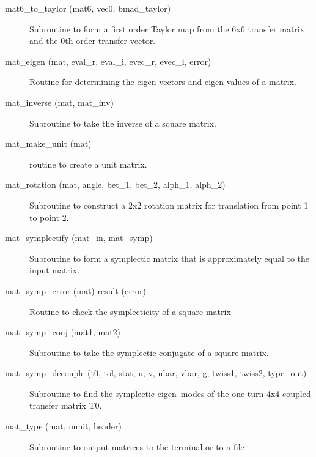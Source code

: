 \begin{description}
\item[mat6_to_taylor (mat6, vec0, bmad_taylor)] \Newline
Subroutine to form a first order Taylor map from the 6x6 transfer matrix 
and the 0th order transfer vector. 

\label{r:mat.eigen}
\item[mat_eigen (mat, eval_r, eval_i, evec_r, evec_i, error)] \Newline 
Routine for determining the eigen vectors and eigen values of a matrix.

\label{r:mat.inverse}
\item[mat_inverse (mat, mat_inv)] \Newline
Subroutine to take the inverse of a square matrix. 

\label{r:mat.make.unit}
\item[mat_make_unit (mat)] \Newline 
     routine to create a unit matrix.

\label{r:mat.rotation}
\item[mat_rotation (mat, angle, bet_1, bet_2, alph_1, alph_2)] \Newline 
     Subroutine to construct a 2x2 rotation matrix for translation from
     point 1 to point 2.

\label{r:mat.symplectify}
\item[mat_symplectify (mat_in, mat_symp)] \Newline
Subroutine to form a symplectic matrix that is approximately equal to the input matrix. 

\label{r:mat.symp.error}
\item[mat_symp_error (mat) result (error)] \Newline
Routine to check the symplecticity of a square matrix 

\label{r:mat.symp.conj}
\item[mat_symp_conj (mat1, mat2)] \Newline 
Subroutine to take the symplectic conjugate of a square matrix.

\label{r:mat.symp.decouple}
\item[mat_symp_decouple (t0, tol, stat, u, v, ubar, vbar, g, twiss1, twiss2, type_out)] \Newline
Subroutine to find the symplectic eigen--modes of the one turn 4x4 coupled 
transfer matrix T0. 

\label{r:mat.type}
\item[mat_type (mat, nunit, header)] \Newline 
     Subroutine to output matrices to the terminal or to a file


\end{description}
